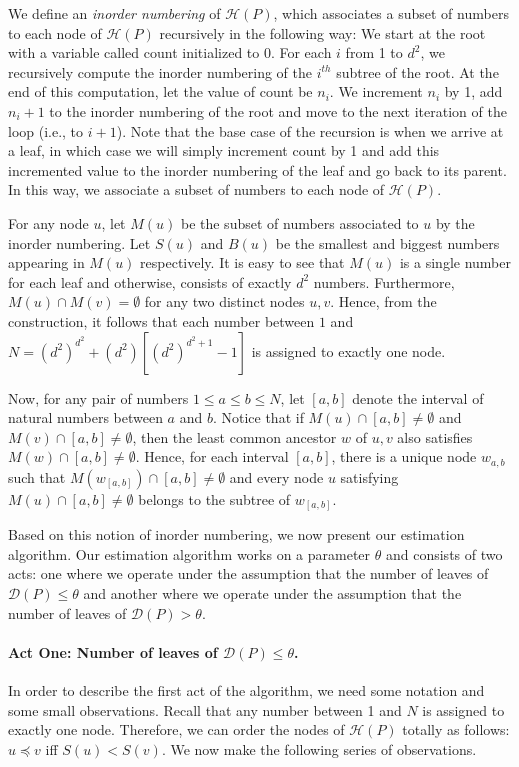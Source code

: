 \documentclass[acmsmall]{acmart}
\begin{document}
We define an \emph{inorder numbering} of $\mathcal{H}(P)$, which associates a subset of numbers to each node of $\mathcal{H}(P)$ recursively in the following way: We start at the root with a variable called count initialized to 0. For each $i$ from 1 to $d^2$, we recursively compute the inorder numbering of the $i^{th}$ subtree of the root. At the end of this computation, let the value of count be $n_i$. We increment $n_i$ by 1,
add $n_i+1$ to the inorder numbering of the root and move to the next iteration of the loop (i.e., to $i+1$). Note that the base case of the recursion is when we arrive at a leaf, in which case we will simply increment count by 1 and add this incremented value to the inorder numbering of the leaf and go back to its parent. In this way, we associate a subset of numbers to each node of $\mathcal{H}(P)$. 

For any node $u$, let $M(u)$ be the subset of numbers associated to $u$ by the inorder numbering. Let $S(u)$ and $B(u)$ be the smallest and biggest numbers appearing in $M(u)$ respectively. It is easy to see that $M(u)$ is a single number for each leaf
and otherwise, consists of exactly $d^2$ numbers. Furthermore, $M(u) \cap M(v) = \emptyset$
for any two distinct nodes $u,v$. 
Hence, from the construction, it follows that each number between $1$ and $N = (d^2)^{d^2} + (d^2)[{(d^2)^{d^2+1}} - 1]$ is assigned to exactly one node.

Now, for any pair of numbers $1 \le a \le b \le N$, let $[a,b]$ denote the interval of natural numbers between $a$ and $b$. Notice that if $M(u) \cap [a,b] \neq \emptyset$
and $M(v) \cap [a,b] \neq \emptyset$, then the least common ancestor $w$ of $u,v$ also satisfies $M(w) \cap [a,b] \neq \emptyset$. Hence, for each interval $[a,b]$, there
is a unique node $w_{a,b}$ such that $M(w_{[a,b]}) \cap [a,b] \neq \emptyset$ and 
every node $u$ satisfying $M(u) \cap [a,b] \neq \emptyset$ belongs to the subtree of $w_{[a,b]}$. 

Based on this notion of inorder numbering, we now present our estimation algorithm. Our estimation algorithm works on a parameter $\theta$ and consists of two acts: one where we operate under the assumption that the number of leaves of $\mathcal{D}(P) \le \theta$ and another where we operate under the assumption that the number of leaves of $\mathcal{D}(P) > \theta$.

\paragraph{Act One: Number of leaves of $\mathcal{D}(P) \le \theta$. }
In order to describe the first act of the algorithm, we need some notation and some small observations. Recall that any number between 1 and $N$ is assigned to exactly one node. Therefore, we can order the nodes of $\mathcal{H}(P)$ totally as follows:
$u \preceq v$ iff $S(u) < S(v)$. We now make the following series of observations.
\end{document}
